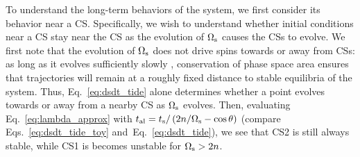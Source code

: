 \documentclass[
        fleqn,
        usenatbib,
    ]{mnras}
\newcommand*{\p}[1]{\left(#1\right)}
\begin{document}
To understand the long-term behaviors of the system, we first consider its
behavior near a CS\@. Specifically, we wish to understand whether initial
conditions near a CS stay near the CS as the evolution of $\Omega_{\rm s}$
causes the CSs to evolve. We first note that the evolution of
$\Omega_{\rm s}$ does not drive spins towards or away from CSs: as long as it
evolves sufficiently slowly \citep[adiabatically,][]{su2020}, conservation of
phase space area ensures that trajectories will remain at a roughly fixed
distance to stable equilibria of the system. Thus, Eq.~\eqref{eq:dsdt_tide}
alone determines whether a point evolves towards or away from a nearby CS as
$\Omega_{\rm s}$ evolves. Then, evaluating Eq.~\eqref{eq:lambda_approx} with
$t_{\rm al} = t_{\rm s} / \p{2n / \Omega_{\rm s} - \cos \theta}$ (compare
Eqs.~\ref{eq:dsdt_tide_toy} and~Eq.~\ref{eq:dsdt_tide}), we see that CS2 is
still always stable, while CS1 is becomes unstable for $\Omega_{\rm s} > 2n$.
\end{document}
